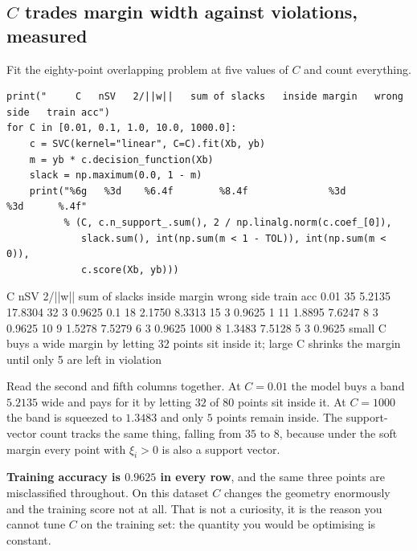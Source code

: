 \documentclass[11pt]{article}
\begin{document}
\subsection{$C$ trades margin width against violations, measured}

Fit the eighty-point overlapping problem at five values of $C$ and count
everything.

\begin{lstlisting}
print("     C   nSV   2/||w||   sum of slacks   inside margin   wrong side   train acc")
for C in [0.01, 0.1, 1.0, 10.0, 1000.0]:
    c = SVC(kernel="linear", C=C).fit(Xb, yb)
    m = yb * c.decision_function(Xb)
    slack = np.maximum(0.0, 1 - m)
    print("%6g   %3d    %6.4f        %8.4f              %3d          %3d      %.4f"
          % (C, c.n_support_.sum(), 2 / np.linalg.norm(c.coef_[0]),
             slack.sum(), int(np.sum(m < 1 - TOL)), int(np.sum(m < 0)),
             c.score(Xb, yb)))
\end{lstlisting}
\begin{codeout}
     C   nSV   2/||w||   sum of slacks   inside margin   wrong side   train acc
  0.01    35    5.2135         17.8304               32            3      0.9625
   0.1    18    2.1750          8.3313               15            3      0.9625
     1    11    1.8895          7.6247                8            3      0.9625
    10     9    1.5278          7.5279                6            3      0.9625
  1000     8    1.3483          7.5128                5            3      0.9625
small C buys a wide margin by letting 32 points sit inside it;
large C shrinks the margin until only 5 are left in violation
\end{codeout}

Read the second and fifth columns together. At $C = 0.01$ the model buys a band
$5.2135$ wide and pays for it by letting $32$ of $80$ points sit inside it. At
$C = 1000$ the band is squeezed to $1.3483$ and only $5$ points remain inside.
The support-vector count tracks the same thing, falling from $35$ to $8$,
because under the soft margin every point with $\xi_i > 0$ is also a support
vector.

\begin{caution}
\textbf{Training accuracy is $0.9625$ in every row}, and the same three points
are misclassified throughout. On this dataset $C$ changes the geometry
enormously and the training score not at all. That is not a curiosity, it is
the reason you cannot tune $C$ on the training set: the quantity you would be
optimising is constant.
\end{caution}
\end{document}
